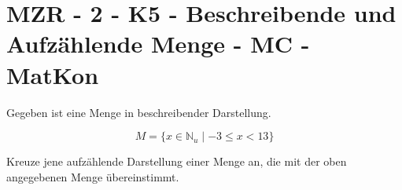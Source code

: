 \section{MZR - 2 - K5 - Beschreibende und Aufzählende Menge - MC - MatKon}

\begin{beispiel}[MZR]{1}
Gegeben ist eine Menge in beschreibender Darstellung.

$$M=\{x\in\mathbb{N}_u\mid -3\leq x<13\}$$

Kreuze jene aufzählende Darstellung einer Menge an, die mit der oben angegebenen Menge übereinstimmt.\vspace{0,2cm}

\end{beispiel}